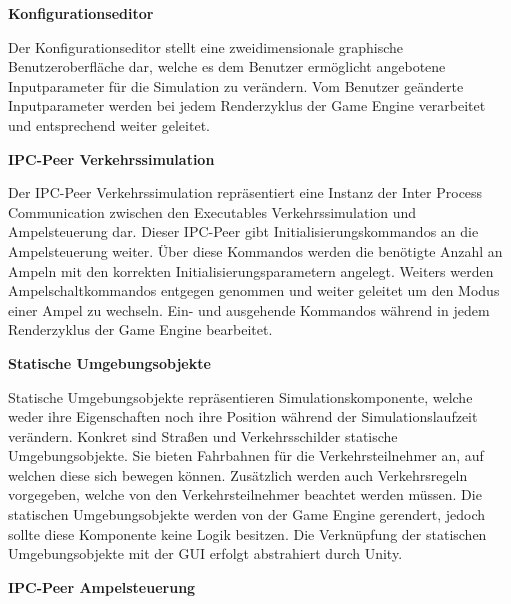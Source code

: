 \begin{flushleft}
\textbf{Konfigurationseditor}
\end{flushleft}
\vspace{-0.3 cm}

Der Konfigurationseditor stellt eine zweidimensionale graphische Benutzeroberfläche dar, welche es dem Benutzer ermöglicht angebotene Inputparameter für die Simulation zu verändern. Vom Benutzer geänderte Inputparameter werden bei jedem Renderzyklus der Game Engine verarbeitet und entsprechend weiter geleitet.

\begin{flushleft}
\textbf{IPC-Peer Verkehrssimulation}
\end{flushleft}
\vspace{-0.3 cm}

Der IPC-Peer Verkehrssimulation repräsentiert eine Instanz der Inter Process Communication zwischen den Executables Verkehrssimulation und Ampelsteuerung dar. Dieser IPC-Peer gibt Initialisierungskommandos an die Ampelsteuerung weiter. Über diese Kommandos werden die benötigte Anzahl an Ampeln mit den korrekten Initialisierungsparametern angelegt. Weiters werden Ampelschaltkommandos entgegen genommen und weiter geleitet um den Modus einer Ampel zu wechseln. Ein- und ausgehende Kommandos während in jedem Renderzyklus der Game Engine bearbeitet.

\begin{flushleft}
\textbf{Statische Umgebungsobjekte}
\end{flushleft}
\vspace{-0.3 cm}

Statische Umgebungsobjekte repräsentieren Simulationskomponente, welche weder ihre Eigenschaften noch ihre Position während der Simulationslaufzeit verändern. Konkret sind Straßen und Verkehrsschilder statische Umgebungsobjekte. Sie bieten Fahrbahnen für die Verkehrsteilnehmer an, auf welchen diese sich bewegen können. Zusätzlich werden auch Verkehrsregeln vorgegeben, welche von den Verkehrsteilnehmer beachtet werden müssen. Die statischen Umgebungsobjekte werden von der Game Engine gerendert, jedoch sollte diese Komponente keine Logik besitzen. Die Verknüpfung der statischen Umgebungsobjekte mit der GUI erfolgt abstrahiert durch Unity.

\begin{flushleft}
\textbf{IPC-Peer Ampelsteuerung}
\end{flushleft}
\vspace{-0.3 cm}

